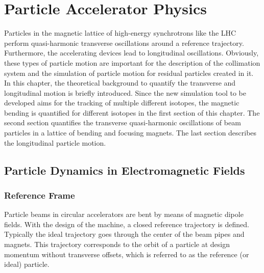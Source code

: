 \chapter{Particle Accelerator Physics}\label{chap:2}
%
%

Particles in the magnetic lattice of high-energy synchrotrons like the LHC perform quasi-harmonic transverse oscillations around a reference trajectory. Furthermore, the accelerating devices lead to longitudinal oscillations. Obviously, these types of particle motion are important for the description of the collimation system and the simulation of particle motion for residual particles created in it. In this chapter, the theoretical background to quantify the transverse and longitudinal motion is briefly introduced. Since the new simulation tool to be developed aims for the tracking of multiple different isotopes, the magnetic bending is quantified for different isotopes in the first section of this chapter. The second section quantifies the transverse quasi-harmonic oscillations of beam particles in a lattice of bending and focusing magnets. The last section describes the longitudinal particle motion.

%

\section{Particle Dynamics in Electromagnetic Fields}

\subsection{Reference Frame} \label{chap:refframe}





Particle beams in circular accelerators are bent by means of magnetic dipole fields. With the design of the machine, a closed reference trajectory is defined. Typically the ideal trajectory goes through the center of the beam pipes and magnets. This trajectory corresponds to the orbit of a particle at design momentum without transverse offsets, which is referred to as the reference (or ideal) particle. 

